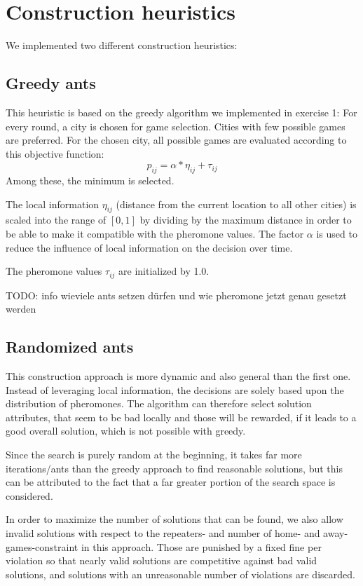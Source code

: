 \section{Construction heuristics}

We implemented two different construction heuristics:

\subsection{Greedy ants}
This heuristic is based on the greedy algorithm we implemented in exercise 1: For every round, a city is chosen for game selection.
Cities with few possible games are preferred.
For the chosen city, all possible games are evaluated according to this objective function:
$$ p_{ij} = \alpha * \eta_{ij} + \tau_{ij}  $$
Among these, the minimum is selected.

The local information $\eta_{ij}$ (distance from the current location to all other cities) is scaled into the range of $[0,1]$ by dividing by the maximum distance in order to be able to make it compatible with the pheromone values.
The factor $\alpha$ is used to reduce the influence of local information on the decision over time.

The pheromone values $\tau_{ij}$ are initialized by 1.0.

TODO: info wieviele ants setzen dürfen und wie pheromone jetzt genau gesetzt werden

\subsection{Randomized ants}

This construction approach is more dynamic and also general than the first one.
Instead of leveraging local information, the decisions are solely based upon the distribution of pheromones. 
The algorithm can therefore select solution attributes, that seem to be bad locally and those will be rewarded, if it leads to a good overall solution, which is not possible with greedy.

Since the search is purely random at the beginning, it takes far more iterations/ants than the greedy approach to find reasonable solutions, but this can be attributed to the fact that a far greater portion of the search space is considered. 

In order to maximize the number of solutions that can be found, we also allow invalid solutions with respect to the repeaters- and number of home- and away-games-constraint in this approach.
Those are punished by a fixed fine per violation so that nearly valid solutions are competitive against bad valid solutions, and solutions with an unreasonable number of violations are discarded.

